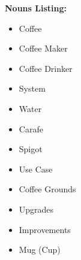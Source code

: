 \documentclass[letterpaper]{article}
\begin{document}
\noindent
\textbf{Nouns Listing:}
\begin{itemize}
\item Coffee
\item Coffee Maker
\item Coffee Drinker
\item System
\item Water
\item Carafe
\item Spigot
\item Use Case
\item Coffee Grounds
\item Upgrades
\item Improvements
\item Mug (Cup)
\end{itemize}
\end{document}
